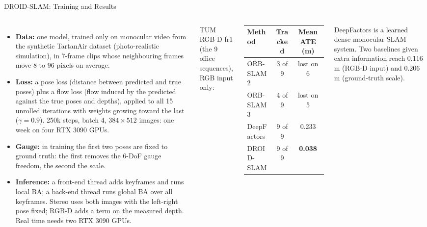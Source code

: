 \begin{frame}{DROID-SLAM: Training and Results}
  \begin{columns}[T,onlytextwidth]
      \begin{itemize}\scriptsize\itemsep0.3em
        \item \textbf{Data:} one model, trained only on monocular video from the synthetic TartanAir dataset (photo-realistic simulation), in 7-frame clips whose neighbouring frames move 8 to 96 pixels on average.
        \item \textbf{Loss:} a pose loss (distance between predicted and true poses) plus a flow loss (flow induced by the predicted against the true poses and depths), applied to all 15 unrolled iterations with weights growing toward the last ($\gamma=0.9$). 250k steps, batch 4, $384\times512$ images: one week on four RTX 3090 GPUs.
        \item \textbf{Gauge:} in training the first two poses are fixed to ground truth: the first removes the 6-DoF gauge freedom, the second the scale.
        \item \textbf{Inference:} a front-end thread adds keyframes and runs local BA; a back-end thread runs global BA over all keyframes. Stereo uses both images with the left-right pose fixed; RGB-D adds a term on the measured depth. Real time needs two RTX 3090 GPUs.
      \end{itemize}
      \centering
      {\scriptsize TUM RGB-D fr1 (the 9 office sequences), RGB input only:\par}
      \vspace{0.2em}
      {\scriptsize\setlength{\tabcolsep}{4pt}
      \begin{tabular}{l c c}
        \toprule
        \textbf{Method} & \textbf{Tracked} & \textbf{Mean ATE (m)} \\
        \midrule
        ORB-SLAM2 & 3 of 9 & lost on 6 \\
        ORB-SLAM3 & 4 of 9 & lost on 5 \\
        DeepFactors & 9 of 9 & 0.233 \\
        DROID-SLAM & 9 of 9 & \textbf{0.038} \\
        \bottomrule
      \end{tabular}\par}
      \vspace{0.2em}
      {\scriptsize DeepFactors is a learned dense monocular SLAM system. Two baselines given extra information reach 0.116\,m (RGB-D input) and 0.206\,m (ground-truth scale).\par}

\end{columns}
\end{frame}
